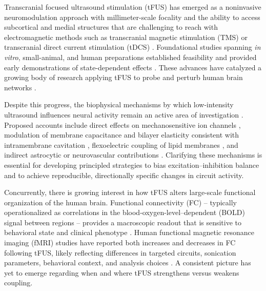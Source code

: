 \noindent
Transcranial focused ultrasound stimulation (tFUS) has emerged as a noninvasive neuromodulation approach with millimeter-scale focality and the ability to access subcortical and medial structures that are challenging to reach with electromagnetic methods such as transcranial magnetic stimulation (TMS) or transcranial direct current stimulation (tDCS) \cite{Naor2016-wz,blackmore2019mechanisms}. Foundational studies spanning \textit{in vitro}, small-animal, and human preparations established feasibility and provided early demonstrations of state-dependent effects \cite{Tyler2008-zs,Tufail2010-jd,legon2014transcranial}. These advances have catalyzed a growing body of research applying tFUS to probe and perturb human brain networks \cite{Legon2014-li,lee2016transcranial,Legon2018-ad,Legon2018-kb,sanguinetti2020transcranial,zhang2021transcranial,yaakub2023transcranial,lord2024transcranial}.

Despite this progress, the biophysical mechanisms by which low-intensity ultrasound influences neural activity remain an active area of investigation \cite{Blackmore2019-zo,kamimura2020ultrasound,dell2022current}. Proposed accounts include direct effects on mechanosensitive ion channels \cite{Sorum2021,Kubanek2018-eo,Yoo2022}, modulation of membrane capacitance and bilayer elasticity consistent with intramembrane cavitation \cite{krasovitski2011intramembrane,Plaksin2014}, flexoelectric coupling of lipid membranes \cite{Petrov2002}, and indirect astrocytic or neurovascular contributions \cite{mishima2024repetitive}. Clarifying these mechanisms is essential for developing principled strategies to bias excitation–inhibition balance and to achieve reproducible, directionally specific changes in circuit activity.

Concurrently, there is growing interest in how tFUS alters large-scale functional organization of the human brain. Functional connectivity (FC) -- typically operationalized as correlations in the blood-oxygen-level–dependent (BOLD) signal between regions -- provides a macroscopic readout that is sensitive to behavioral state and clinical phenotype \cite{rogers2007assessing,van2010exploring}. Human functional magnetic resonance imaging (fMRI) studies have reported both increases and decreases in FC following tFUS, likely reflecting differences in targeted circuits, sonication parameters, behavioral context, and analysis choices \cite{chou2024transcranial,yaakub2023transcranial,todd2018focused,meng2019resting,sanguinetti2020transcranial,zhang2021low,kuhn2023transcranial,lord2024transcranial}. A consistent picture has yet to emerge regarding when and where tFUS strengthens versus weakens coupling.

